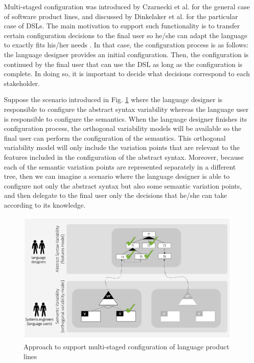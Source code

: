 Multi-staged configuration was introduced by Czarnecki et al. \cite{Czarnecki:2004} for the general case of software product lines, and discussed by Dinkelaker et al. \cite{Dinkelaker:2010} for the particular case of DSLs. The main motivation to support such functionality is to transfer certain configuration decisions to the final user so he/she can adapt the language to exactly fits his/her needs \cite{Dinkelaker:2010}. In that case, the configuration process is as follows: the language designer provides an initial configuration. Then, the configuration is continued by the final user that can use the DSL as long as the configuration is complete. In doing so, it is important to decide what decisions correspond to each stakeholder.

Suppose the scenario introduced in Fig. \ref{fig:languages-configuration-modeling} where the language designer is responsible to configure the abstract syntax variability whereas the language user is responsible to configure the semantics. When the language designer finishes its configuration process, the orthogonal variability models will be available so the final user can perform the configuration of the semantics. This orthogonal variability model will only include the variation points that are relevant to the features included in the configuration of the abstract syntax. Moreover, because each of the semantic variation points are represented separately in a different tree, then we can imagine a scenario where the language designer is able to configure not only the abstract syntax but also some semantic variation points, and then delegate to the final user only the decisions that he/she can take according to its knowledge. 

\begin{figure}
  \centering\includegraphics[width=1\linewidth]{images/languages-configuration-fig.png}
  \caption{Approach to support multi-staged configuration of language product lines}
  \label{fig:languages-configuration-modeling}
\end{figure}

